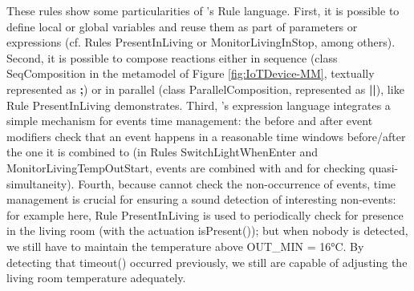 These rules show some particularities of \IOTDSL's Rule language. First, it is possible to define local or global variables and reuse them as part of parameters or expressions (cf. Rules \textsf{PresentInLiving} or \textsf{MonitorLivingInStop}, among others). Second, it is possible to compose reactions either in sequence (class \textsf{SeqComposition} in the metamodel of Figure \ref{fig:IoTDevice-MM}, textually represented as \textsf{\textbf{;}}) or in parallel (class \textsf{ParallelComposition}, represented as \textsf{\textbf{||}}), like Rule \textsf{PresentInLiving} demonstrates. Third, \IOTDSL's expression language integrates a simple mechanism for events time management: the \textsf{before} and \textsf{after} event modifiers check that an event happens in a reasonable time windows before/after the one it is combined to (in Rules \textsf{SwitchLightWhenEnter} and \textsf{MonitorLivingTempOutStart}, events are combined with \textsf{and} for checking quasi-simultaneity). Fourth, because \IOTDSL cannot check the non-occurrence of events, time management is crucial for ensuring a sound detection of interesting non-events: for example here, Rule \textsf{PresentInLiving} is used to periodically check for presence in the living room (with the actuation \textsf{isPresent()}); but when nobody is detected, we still have to maintain the temperature above \textsf{OUT\_MIN} = 16°C. By detecting that \textsf{timeout()} occurred previously, we still are capable of adjusting the living room temperature adequately.

